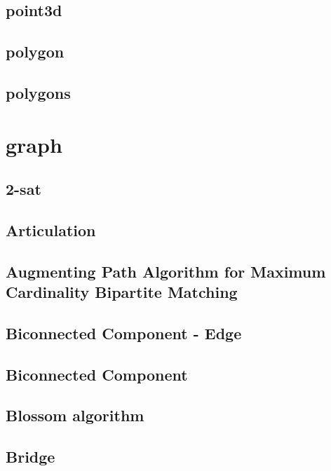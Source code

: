 \documentclass[a4paper,5pt,titlepage]{article}
\begin{document}
\subsection{point3d}

\subsection{polygon}

\subsection{polygons}

\section{graph}
\subsection{2-sat}

\subsection{Articulation}

\subsection{Augmenting Path Algorithm for Maximum Cardinality Bipartite Matching}

\subsection{Biconnected Component - Edge}

\subsection{Biconnected Component}

\subsection{Blossom algorithm}

\subsection{Bridge}

\end{document}
